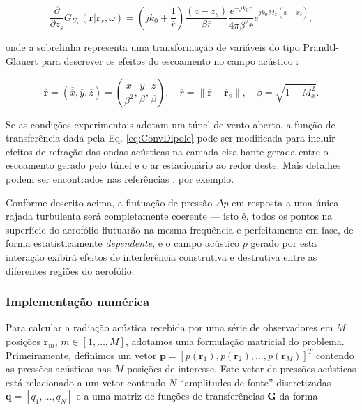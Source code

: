 \documentclass[a4paper, 11pt, twoside]{article}
\providecommand{\norm}[1]{\lVert#1\rVert}
\begin{document}
\begin{equation}
	\frac{\partial}{\partial z_s} G_{U_x} (\mathbf{r} | \mathbf{r}_s, \omega) = \left(jk_0 + \frac{1}{\overline{r}} \right) \frac{\left(\overline{z}-\overline{z}_s \right)}{\beta \overline{r}}  \frac{e^{-j k_0 \overline{r}}}{4 \pi \beta^2 \overline{r}} e^{j k_0 M_x \left( \overline{\overline{x}} - \overline{\overline{x}}_s \right)},
	\label{eq:ConvDipole}
\end{equation}

\noindent onde a sobrelinha representa uma transformação de variáveis do tipo Prandtl-Glauert para descrever os efeitos do escoamento no campo acústico \cite{Chapman00}:

\begin{equation}
	\overline{\mathbf{r}} = \left( \overline{\overline{x}}, \overline{y}, \overline{z} \right) = \left( \frac{x}{\beta^2}, \frac{y}{\beta}, \frac{z}{\beta} \right), \quad \overline{r} = \norm{\overline{\mathbf{r}} - \overline{\mathbf{r}}_s}, \quad \beta = \sqrt{1-M_x^2}.
	\label{eq:ChapmanTransformedVariables}
\end{equation}

Se as condições experimentais adotam um túnel de vento aberto, a função de transferência dada pela Eq. \ref{eq:ConvDipole} pode ser modificada para incluir efeitos de refração das ondas acústicas na camada cisalhante gerada entre o escoamento gerado pelo túnel e o ar estacionário ao redor deste. Mais detalhes podem ser encontrados nas referências \cite{Casagrande18, Casagrande_etal2020}, por exemplo.

Conforme descrito acima, a flutuação de pressão $\Delta p$ em resposta a uma única rajada turbulenta será completamente coerente --- isto é, todos os pontos na superfície do aerofólio flutuarão na mesma frequência e perfeitamente em fase, de forma estatisticamente \emph{dependente}, e o campo acústico $p$ gerado por esta interação exibirá efeitos de interferência construtiva e destrutiva entre as diferentes regiões do aerofólio.


\subsubsection{Implementação numérica}
\label{sec:NumericalImplementation_SingleGust}

Para calcular a radiação acústica recebida por uma série de observadores em $M$ posições $\mathbf{r}_m$, $m \in [1, \ldots, M]$, adotamos uma formulação matricial do problema. Primeiramente, definimos um vetor $\mathbf{p} = [p(\mathbf{r}_1), p(\mathbf{r}_2), \ldots, p(\mathbf{r}_M)]^T$ contendo as pressões acústicas nas $M$ posições de interesse. Este vetor de pressões acústicas está relacionado a um vetor contendo $N$ ``amplitudes de fonte'' discretizadas $\mathbf{q} = [q_1, \ldots, q_N]$ e a uma matriz de funções de transferências $\mathbf{G}$ da forma
\end{document}
